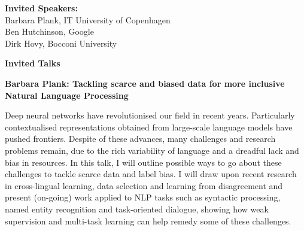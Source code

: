 \documentclass[a4paper,11pt,oneside]{book}
\begin{document}
\begin{description}


\vspace{3mm}
\item{\bf Invited Speakers:}\vspace{2mm} \\
  Barbara Plank, IT University of Copenhagen \\
  Ben Hutchinson, Google \\
  Dirk Hovy, Bocconi University



\end{description}


\clearpage




\begin{center}
  {\Large \bf Invited Talks}
\end{center}

\vspace*{0.5cm}

\textbf{Barbara Plank: Tackling scarce and biased data for more inclusive Natural Language Processing}

Deep neural networks have revolutionised our field in recent years. Particularly contextualised representations obtained from large-scale language models have pushed frontiers. Despite of these advances, many challenges and research problems remain, due to the rich variability of language and a dreadful lack and bias in resources. In this talk, I will outline possible ways to go about these challenges to tackle scarce data and label bias. I will draw upon recent research in cross-lingual learning, data selection and learning from disagreement and present (on-going) work applied to NLP tasks such as syntactic processing, named entity recognition and task-oriented dialogue, showing how weak supervision and multi-task learning can help remedy some of these challenges.
\end{document}
